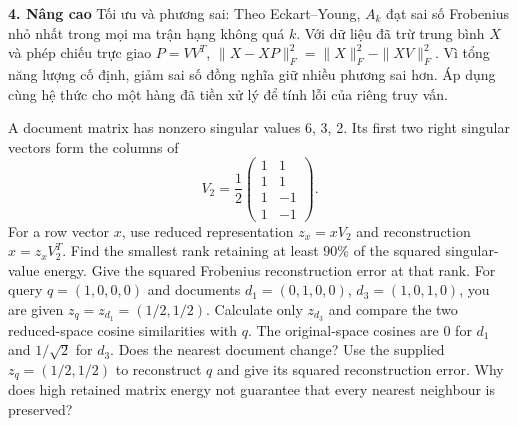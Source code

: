 \documentclass[10pt,a4paper,twocolumn]{article}
\newcommand{\key}[1]{#1:\enspace}
\newcommand{\unitheading}[2]{%
  \par\addvspace{1pt}\noindent\textbf{#1. #2}\enspace}
\newcommand{\unitadvanced}{\unitheading{4}{Nâng cao}}
\begin{document}
\unitadvanced
\key{Tối ưu và phương sai} Theo Eckart--Young, $A_k$ đạt sai số Frobenius nhỏ nhất trong mọi ma trận hạng không quá $k$. Với dữ liệu đã trừ trung bình $X$ và phép chiếu trực giao $P=VV^T$, $\|X-XP\|_F^2=\|X\|_F^2-\|XV\|_F^2$. Vì tổng năng lượng cố định, giảm sai số đồng nghĩa giữ nhiều phương sai hơn. Áp dụng cùng hệ thức cho một hàng đã tiền xử lý để tính lỗi của riêng truy vấn.


A document matrix has nonzero singular values 6, 3, 2. Its first two right singular vectors form the columns of
\[
V_2=\frac12\begin{pmatrix}1&1\\1&1\\1&-1\\1&-1\end{pmatrix}.
\]
For a row vector $x$, use reduced representation $z_x=xV_2$ and reconstruction $\hat x=z_xV_2^T$.
 Find the smallest rank retaining at least 90\% of the squared singular-value energy. Give the squared Frobenius reconstruction error at that rank.
 For query $q=(1,0,0,0)$ and documents $d_1=(0,1,0,0)$, $d_3=(1,0,1,0)$, you are given $z_q=z_{d_1}=(1/2,1/2)$. Calculate only $z_{d_3}$ and compare the two reduced-space cosine similarities with $q$. The original-space cosines are 0 for $d_1$ and $1/\sqrt2$ for $d_3$. Does the nearest document change?
 Use the supplied $z_q=(1/2,1/2)$ to reconstruct $q$ and give its squared reconstruction error. Why does high retained matrix energy not guarantee that every nearest neighbour is preserved?
\end{document}
